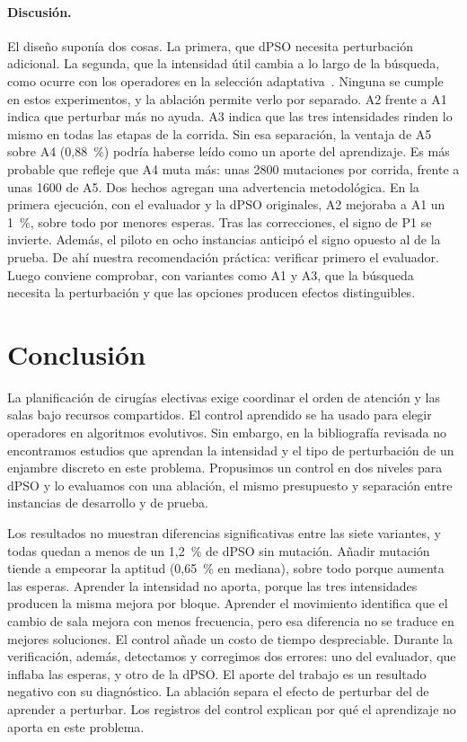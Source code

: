 \documentclass[10pt,a4paper]{article}
\begin{document}
\paragraph{Discusión.}
El diseño suponía dos cosas. La primera, que dPSO necesita perturbación adicional. La segunda,
que la intensidad útil cambia a lo largo de la búsqueda, como ocurre con los operadores en la
selección adaptativa~\cite{fialho2010}. Ninguna se cumple en estos experimentos, y la ablación permite
verlo por separado. A2 frente a A1 indica que perturbar más no ayuda. A3 indica que las tres
intensidades rinden lo mismo en todas las etapas de la corrida. Sin esa separación, la ventaja
de A5 sobre A4 (0,88~\%) podría haberse leído como un aporte del aprendizaje. Es más probable que
refleje que A4 muta más: unas 2800 mutaciones por corrida, frente a unas 1600 de A5. Dos hechos
agregan una advertencia metodológica. En la primera ejecución, con el evaluador y la dPSO
originales, A2 mejoraba a A1 un 1~\%, sobre todo por menores esperas. Tras las correcciones, el signo
de P1 se invierte. Además, el piloto en ocho instancias anticipó el signo opuesto al de la
prueba. De ahí nuestra recomendación práctica: verificar primero el evaluador. Luego conviene
comprobar, con variantes como A1 y A3, que la búsqueda necesita la perturbación y que las
opciones producen efectos distinguibles.

\section{Conclusión}

La planificación de cirugías electivas exige coordinar el orden de atención y las salas bajo
recursos compartidos. El control aprendido se ha usado para elegir operadores en algoritmos
evolutivos. Sin embargo, en la bibliografía revisada no encontramos estudios que aprendan la intensidad y
el tipo de perturbación de un enjambre discreto en este problema. Propusimos un control en dos niveles para dPSO y lo evaluamos
con una ablación, el mismo presupuesto y separación entre instancias de desarrollo y de prueba.

Los resultados no muestran diferencias significativas entre las siete variantes, y todas quedan
a menos de un 1,2~\% de dPSO sin mutación. Añadir mutación tiende a empeorar la aptitud
(0,65~\% en mediana), sobre todo porque aumenta las esperas. Aprender la intensidad no aporta,
porque las tres intensidades producen la misma mejora por bloque. Aprender el movimiento
identifica que el cambio de sala mejora con menos frecuencia, pero esa diferencia no se traduce
en mejores soluciones. El control añade un costo de tiempo despreciable. Durante la verificación,
además, detectamos y corregimos dos errores: uno del evaluador, que inflaba las esperas, y otro de
la dPSO. El aporte del trabajo es un resultado negativo con su diagnóstico. La ablación separa el
efecto de perturbar del de aprender a perturbar. Los registros del control explican por qué el
aprendizaje no aporta en este problema.
\end{document}
